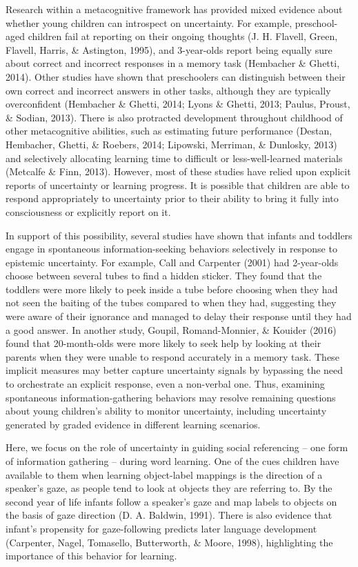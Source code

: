 \documentclass[10pt, letterpaper]{article}
\begin{document}
Research within a metacognitive framework has provided mixed evidence
about whether young children can introspect on uncertainty. For example,
preschool-aged children fail at reporting on their ongoing thoughts (J.
H. Flavell, Green, Flavell, Harris, \& Astington, 1995), and 3-year-olds
report being equally sure about correct and incorrect responses in a
memory task (Hembacher \& Ghetti, 2014). Other studies have shown that
preschoolers can distinguish between their own correct and incorrect
answers in other tasks, although they are typically overconfident
(Hembacher \& Ghetti, 2014; Lyons \& Ghetti, 2013; Paulus, Proust, \&
Sodian, 2013). There is also protracted development throughout childhood
of other metacognitive abilities, such as estimating future performance
(Destan, Hembacher, Ghetti, \& Roebers, 2014; Lipowski, Merriman, \&
Dunlosky, 2013) and selectively allocating learning time to difficult or
less-well-learned materials (Metcalfe \& Finn, 2013). However, most of
these studies have relied upon explicit reports of uncertainty or
learning progress. It is possible that children are able to respond
appropriately to uncertainty prior to their ability to bring it fully
into consciousness or explicitly report on it.

In support of this possibility, several studies have shown that infants
and toddlers engage in spontaneous information-seeking behaviors
selectively in response to epistemic uncertainty. For example, Call and
Carpenter (2001) had 2-year-olds choose between several tubes to find a
hidden sticker. They found that the toddlers were more likely to peek
inside a tube before choosing when they had not seen the baiting of the
tubes compared to when they had, suggesting they were aware of their
ignorance and managed to delay their response until they had a good
answer. In another study, Goupil, Romand-Monnier, \& Kouider (2016)
found that 20-month-olds were more likely to seek help by looking at
their parents when they were unable to respond accurately in a memory
task. These implicit measures may better capture uncertainty signals by
bypassing the need to orchestrate an explicit response, even a
non-verbal one. Thus, examining spontaneous information-gathering
behaviors may resolve remaining questions about young children's ability
to monitor uncertainty, including uncertainty generated by graded
evidence in different learning scenarios.

Here, we focus on the role of uncertainty in guiding social referencing
-- one form of information gathering -- during word learning. One of the
cues children have available to them when learning object-label mappings
is the direction of a speaker's gaze, as people tend to look at objects
they are referring to. By the second year of life infants follow a
speaker's gaze and map labels to objects on the basis of gaze direction
(D. A. Baldwin, 1991). There is also evidence that infant's propensity
for gaze-following predicts later language development (Carpenter,
Nagel, Tomasello, Butterworth, \& Moore, 1998), highlighting the
importance of this behavior for learning.
\end{document}
